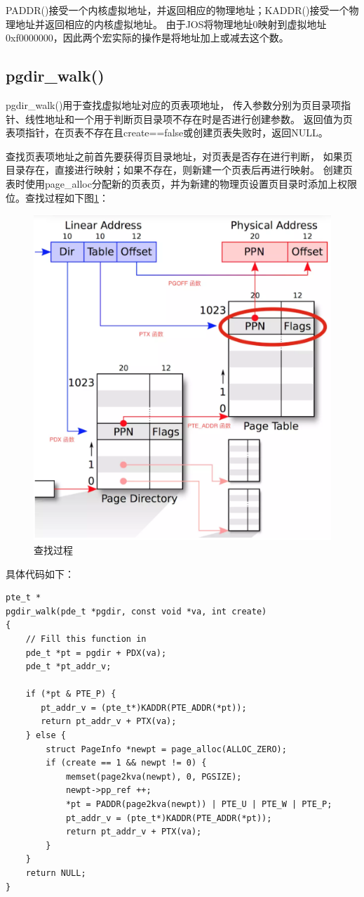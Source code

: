 \documentclass[12pt,a4paper,UTF8]{article}
\begin{document}
    PADDR()接受一个内核虚拟地址，并返回相应的物理地址；KADDR()接受一个物理地址并返回相应的内核虚拟地址。
    由于JOS将物理地址0映射到虚拟地址0xf0000000，因此两个宏实际的操作是将地址加上或减去这个数。

    \subsection{pgdir\_walk()}

    pgdir\_walk()用于查找虚拟地址对应的页表项地址，
    传入参数分别为页目录项指针、线性地址和一个用于判断页目录项不存在时是否进行创建参数。
    返回值为页表项指针，在页表不存在且create==false或创建页表失败时，返回NULL。
    
    查找页表项地址之前首先要获得页目录地址，对页表是否存在进行判断，
    如果页目录存在，直接进行映射；如果不存在，则新建一个页表后再进行映射。
    创建页表时使用page\_alloc分配新的页表页，并为新建的物理页设置页目录时添加上权限位。查找过程如下图\ref{fig::figure1}：

    \begin{figure}[H]
        \centering
        \includegraphics[width = .75\linewidth]{img/1.png}
        \caption{查找过程}
        \label{fig::figure1}
    \end{figure}

    具体代码如下：

    \begin{lstlisting}[style=CPP]
pte_t *
pgdir_walk(pde_t *pgdir, const void *va, int create)
{
	// Fill this function in
	pde_t *pt = pgdir + PDX(va);
   	pde_t *pt_addr_v;

    if (*pt & PTE_P) {
   	   pt_addr_v = (pte_t*)KADDR(PTE_ADDR(*pt));
   	   return pt_addr_v + PTX(va);
   	} else {
	    struct PageInfo *newpt = page_alloc(ALLOC_ZERO);
        if (create == 1 && newpt != 0) {
            memset(page2kva(newpt), 0, PGSIZE);
            newpt->pp_ref ++;
            *pt = PADDR(page2kva(newpt)) | PTE_U | PTE_W | PTE_P;
            pt_addr_v = (pte_t*)KADDR(PTE_ADDR(*pt));
            return pt_addr_v + PTX(va);
        }
    }
	return NULL;
}
    \end{lstlisting}
\end{document}
